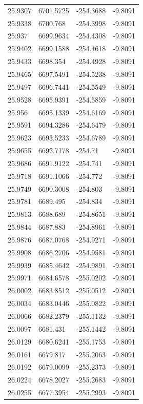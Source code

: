 \begin{table}[H]
\begin{tabular}{llll}
25.9307 & 6701.5725 & -254.3688 & -9.8091 \\
25.9338 & 6700.768 & -254.3998 & -9.8091 \\
25.937 & 6699.9634 & -254.4308 & -9.8091 \\
25.9402 & 6699.1588 & -254.4618 & -9.8091 \\
25.9433 & 6698.354 & -254.4928 & -9.8091 \\
25.9465 & 6697.5491 & -254.5238 & -9.8091 \\
25.9497 & 6696.7441 & -254.5549 & -9.8091 \\
25.9528 & 6695.9391 & -254.5859 & -9.8091 \\
25.956 & 6695.1339 & -254.6169 & -9.8091 \\
25.9591 & 6694.3286 & -254.6479 & -9.8091 \\
25.9623 & 6693.5233 & -254.6789 & -9.8091 \\
25.9655 & 6692.7178 & -254.71 & -9.8091 \\
25.9686 & 6691.9122 & -254.741 & -9.8091 \\
25.9718 & 6691.1066 & -254.772 & -9.8091 \\
25.9749 & 6690.3008 & -254.803 & -9.8091 \\
25.9781 & 6689.495 & -254.834 & -9.8091 \\
25.9813 & 6688.689 & -254.8651 & -9.8091 \\
25.9844 & 6687.883 & -254.8961 & -9.8091 \\
25.9876 & 6687.0768 & -254.9271 & -9.8091 \\
25.9908 & 6686.2706 & -254.9581 & -9.8091 \\
25.9939 & 6685.4642 & -254.9891 & -9.8091 \\
25.9971 & 6684.6578 & -255.0202 & -9.8091 \\
26.0002 & 6683.8512 & -255.0512 & -9.8091 \\
26.0034 & 6683.0446 & -255.0822 & -9.8091 \\
26.0066 & 6682.2379 & -255.1132 & -9.8091 \\
26.0097 & 6681.431 & -255.1442 & -9.8091 \\
26.0129 & 6680.6241 & -255.1753 & -9.8091 \\
26.0161 & 6679.817 & -255.2063 & -9.8091 \\
26.0192 & 6679.0099 & -255.2373 & -9.8091 \\
26.0224 & 6678.2027 & -255.2683 & -9.8091 \\
26.0255 & 6677.3954 & -255.2993 & -9.8091 \\

\end{tabular}
\end{table}
